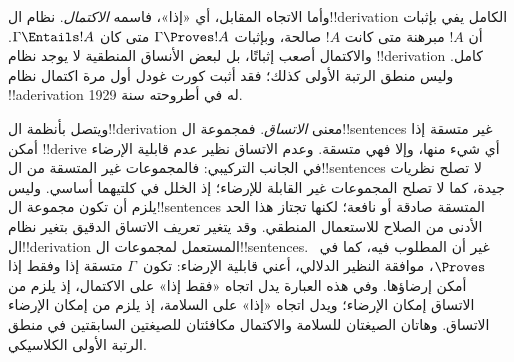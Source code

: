 \documentclass[../../../include/open-logic-section]{subfiles}
\begin{document}
وأما الاتجاه المقابل، أي «إذا»، فاسمه \emph{الاكتمال}. نظام ال!!{derivation} الكامل يفي بإثبات أن $!A$ مبرهنة متى كانت $!A$ صالحة، وبإثبات
$\Gamma \Proves !A$ متى كان $\Gamma \Entails !A$.
والاكتمال أصعب إثباتًا، بل لبعض الأنساق المنطقية لا يوجد نظام
!!{derivation} كامل. وليس منطق الرتبة الأولى كذلك؛ فقد أثبت كورت غودل أول مرة اكتمال نظام
!!a{derivation} له في أطروحته سنة 1929.

ويتصل بأنظمة ال!!{derivation} معنى \emph{الاتساق}. فمجموعة ال!!{sentence}s غير متسقة إذا أمكن
!!{derive} أي شيء منها، وإلا فهي متسقة. وعدم الاتساق نظير عدم قابلية الإرضاء في الجانب التركيبي: فالمجموعات غير المتسقة من ال!!{sentence}s لا تصلح نظريات جيدة، كما لا تصلح المجموعات غير القابلة للإرضاء؛ إذ الخلل في كلتيهما أساسي. وليس يلزم أن تكون مجموعة ال!!{sentence}s المتسقة صادقة أو نافعة؛ لكنها تجتاز هذا الحد الأدنى من الصلاح للاستعمال المنطقي.
وقد يتغير تعريف الاتساق الدقيق بتغير نظام ال!!{derivation} المستعمل لمجموعات ال!!{sentence}s. غير أن المطلوب فيه، كما في~$\Proves$، موافقة النظير الدلالي، أعني قابلية الإرضاء: تكون~$\Gamma$ متسقة إذا وفقط إذا أمكن إرضاؤها. وفي هذه العبارة يدل اتجاه «فقط إذا» على الاكتمال، إذ يلزم من الاتساق إمكان الإرضاء؛ ويدل اتجاه «إذا» على السلامة، إذ يلزم من إمكان الإرضاء الاتساق. وهاتان الصيغتان للسلامة والاكتمال مكافئتان للصيغتين السابقتين في منطق الرتبة الأولى الكلاسيكي.
\end{document}
